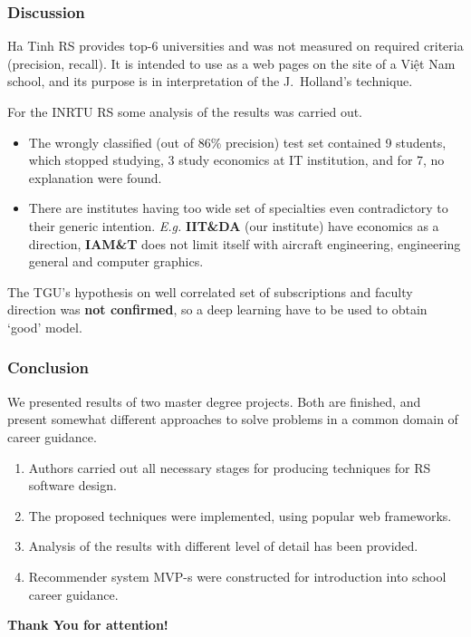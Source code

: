 \documentclass[10pt,dvipsnames]{beamer}
\newcommand{\irnitu}{INRTU}
\begin{document}

\begin{frame}
  \frametitle{Discussion}

  Ha Tinh RS provides top-6 universities and was not measured on required criteria (precision, recall). It is intended to use as a web pages on the site of a Việt Nam school, and its purpose is in interpretation of the J.~Holland's technique.

  For the \irnitu{} RS some analysis of the results was carried out.
  \begin{itemize}
  \item The wrongly classified (out of 86\% precision) test set contained 9 students, which stopped studying, 3 study economics at IT institution, and for 7, no explanation were found.
  \item There are institutes having too wide set of specialties even contradictory to their generic intention. \emph{E.g.} \textbf{IIT\&DA} (our institute) have economics as a direction, \textbf{IAM\&T} does not limit itself with aircraft engineering, engineering general and computer graphics.
  \end{itemize}

The TGU's hypothesis on well correlated set of subscriptions and faculty direction was \textbf{not confirmed}, so a deep learning have to be used to obtain `good' model.

\end{frame}

\begin{frame}
  \frametitle{Conclusion}
  We presented results of two master degree projects.  Both are finished, and present somewhat different approaches to solve problems in a common domain of career guidance.
  \begin{enumerate}
  \item Authors carried out all necessary stages for producing techniques for RS software design.
  \item The proposed techniques were implemented, using popular web frameworks.
  \item Analysis of the results with different level of detail has been provided.
  \item Recommender system MVP-s were constructed for introduction into school career guidance.
  \end{enumerate}

\end{frame}


\begin{frame}{}
  \vfill
  \centering
  \Huge \textbf{Thank You for attention!}
\end{frame}
\end{document}
